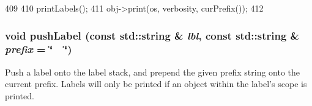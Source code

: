 \begin{DoxyCode}
409 {
410     printLabels();
411     obj->print(os, verbosity, curPrefix());
412 }
\end{DoxyCode}
\hypertarget{classPacket_1_1PrintReqState_a41a5d865ff796adb9576e663888d1b6a}{
\subsubsection[{pushLabel}]{\setlength{\rightskip}{0pt plus 5cm}void pushLabel (const std::string \& {\em lbl}, \/  const std::string \& {\em prefix} = {\ttfamily \char`\"{}~~\char`\"{}})}}
\label{classPacket_1_1PrintReqState_a41a5d865ff796adb9576e663888d1b6a}
Push a label onto the label stack, and prepend the given prefix string onto the current prefix. Labels will only be printed if an object within the label's scope is printed. 

